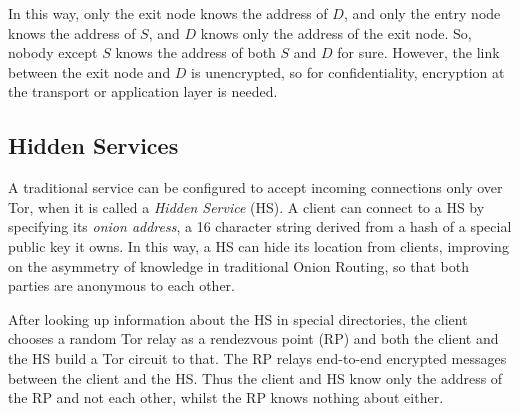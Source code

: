 \documentclass[diss.tex]{subfiles}
\begin{document}
\begin{figure}[H]
\centering
{}
\end{figure}

In this way, only the exit node knows the address of $D$, and only the entry node knows the address of $S$, and $D$ knows only the address of the exit node. So, nobody except $S$ knows the address of both $S$ and $D$ for sure. However, the link between the exit node and $D$ is unencrypted, so for confidentiality, encryption at the transport or application layer is needed.
\subsection{Hidden Services}
A traditional service can be configured to accept incoming connections only over Tor, when it is called a \textit{Hidden Service} (HS). A client can connect to a HS by specifying its \textit{onion address}, a 16 character string derived from a hash of a special public key it owns. In this way, a HS can hide its location from clients, improving on the asymmetry of knowledge in traditional Onion Routing, so that both parties are anonymous to each other. 

After looking up information about the HS in special directories, the client chooses a random Tor relay as a rendezvous point (RP) and both the client and the HS build a Tor circuit to that. The RP relays end-to-end encrypted messages between the client and the HS. Thus the client and HS know only the address of the RP and not each other, whilst the RP knows nothing about either.
\end{document}
